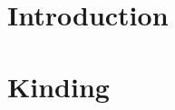 \documentclass[acmsmall, screen, review]{acmart}
\begin{document}
\maketitle


\section{Introduction}
\label{sec:introduction}


\section{Kinding}
\label{sec:kinding}



\end{document}
